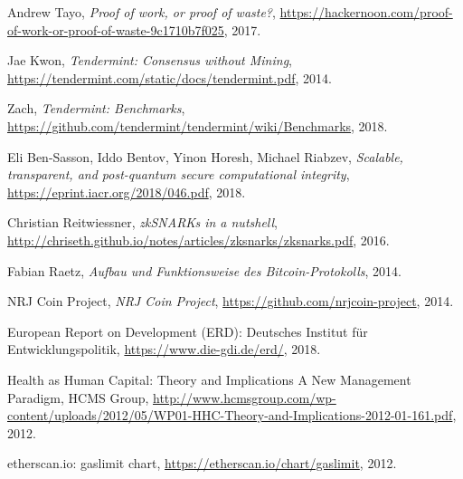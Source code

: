 \begin{thebibliography}{9}
  Andrew Tayo,
  \textit{Proof of work, or proof of waste?},
  \url{https://hackernoon.com/proof-of-work-or-proof-of-waste-9c1710b7f025},
  2017.  
  
  Jae Kwon,
  \textit{Tendermint: Consensus without Mining},
  \url{https://tendermint.com/static/docs/tendermint.pdf},
  2014.
  
  Zach,
  \textit{Tendermint: Benchmarks},
  \url{https://github.com/tendermint/tendermint/wiki/Benchmarks},
  2018.
  
  Eli Ben-Sasson, Iddo Bentov, Yinon Horesh, Michael Riabzev,
  \textit{Scalable, transparent, and post-quantum secure computational
integrity},
  \url{https://eprint.iacr.org/2018/046.pdf},
  2018.
  
  Christian Reitwiessner,
  \textit{zkSNARKs in a nutshell},
  \url{http://chriseth.github.io/notes/articles/zksnarks/zksnarks.pdf},
  2016.

  Fabian Raetz,
  \textit{Aufbau und Funktionsweise des Bitcoin-Protokolls},
  2014.  

  NRJ Coin Project,
  \textit{NRJ Coin Project},
  \url{https://github.com/nrjcoin-project},
  2014.

  European Report on Development (ERD): Deutsches Institut für Entwicklungspolitik,
  \url{https://www.die-gdi.de/erd/},
  2018.
  
  Health as Human Capital: Theory and Implications A New Management Paradigm, HCMS Group,
  \url{http://www.hcmsgroup.com/wp-content/uploads/2012/05/WP01-HHC-Theory-and-Implications-2012-01-161.pdf},
  2012.
 
  etherscan.io: gaslimit chart,
  \url{https://etherscan.io/chart/gaslimit},
  2012. 

\end{thebibliography}

